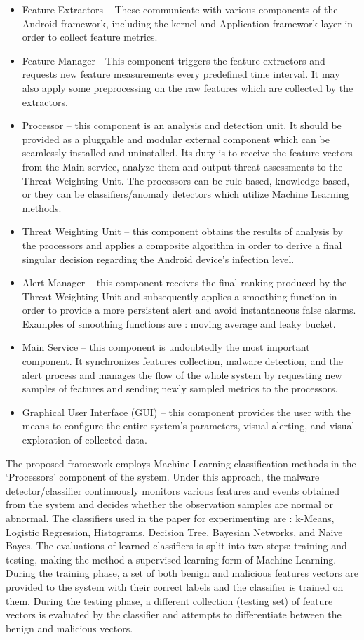 \documentclass[11pt]{article}
\begin{document}
	\begin{itemize}
		\item Feature Extractors – These communicate with various components of the Android framework, including the kernel and Application framework layer in order to collect feature metrics.
		\item Feature Manager -  This component triggers the feature extractors and requests new feature measurements every predefined time interval. It may also apply some preprocessing on the raw features which are collected by the extractors. 
		\item Processor – this component is an analysis and detection unit. It should be provided as a pluggable and modular external component which can be seamlessly installed and uninstalled. Its duty is to receive the feature vectors from the Main service, analyze them and output threat assessments to the Threat Weighting Unit. The processors can be rule based, knowledge based, or they can be classifiers/anomaly detectors which utilize Machine Learning methods.
		\item Threat Weighting Unit – this component obtains the results of analysis by the processors and applies a composite algorithm in order to derive a final singular decision regarding the Android device’s infection level. 
		\item Alert Manager – this component receives the final ranking produced by the Threat Weighting Unit and subsequently applies a smoothing function in order to provide a more persistent alert and avoid instantaneous false alarms. Examples of smoothing functions are : moving average and leaky bucket.
		\item Main Service – this component is undoubtedly the most important component. It synchronizes features collection, malware detection, and the alert process and manages the flow of the whole system by requesting new samples of features and sending newly sampled metrics to the processors.
		\item Graphical User Interface (GUI) – this component provides the user with the means to configure the entire system’s parameters, visual alerting, and visual exploration of collected data.
	\end{itemize}
		The proposed framework employs Machine Learning classification methods in the ‘Processors’ component of the system. Under this approach, the malware detector/classifier continuously monitors various features and events obtained from the system and decides whether the observation samples are normal or abnormal. The classifiers used in the paper for experimenting are : k-Means, Logistic Regression, Histograms, Decision Tree, Bayesian Networks, and Naive Bayes. The evaluations of learned classifiers is split into two steps: training and testing, making the method a supervised learning  form of Machine Learning. During the training phase, a set of both benign and malicious features vectors are provided to the system with their correct labels and the classifier is trained on them. During the testing phase, a different collection (testing set) of feature vectors is evaluated by the classifier and  attempts to differentiate between the benign and malicious vectors.
\end{document}
